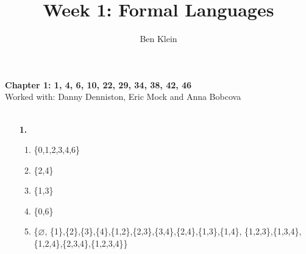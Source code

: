 \documentclass[]{article}
\title{Week 1: Formal Languages}
\author{Ben Klein}
\begin{document}
\maketitle

\textbf{Chapter 1: 1, 4, 6, 10, 22, 29, 34, 38, 42, 46
}\\

Worked with: Danny Denniston, Eric Mock and Anna Bobcova
\\
\\
\begin{flushleft}
\begin{enumerate}

	\item [\textbf{1.}]
	\begin{enumerate}
		\item \{0,1,2,3,4,6\}
		\item \{2,4\}
		\item \{1,3\} 
		\item \{0,6\}
		\item \{$\varnothing$, \{1\},\{2\},\{3\},\{4\},\{1,2\},\{2,3\},\{3,4\},\{2,4\},\{1,3\},\{1,4\},
		\{1,2,3\},\{1,3,4\},\{1,2,4\},\{2,3,4\},\{1,2,3,4\}\}
	\end{enumerate}
	

\end{enumerate}
\end{flushleft}
\end{document}

